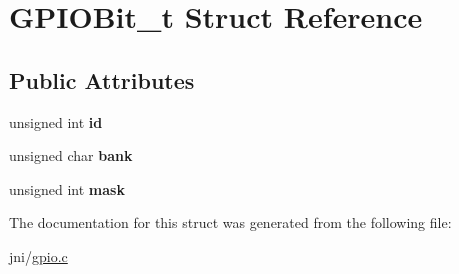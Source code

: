 \hypertarget{structGPIOBit__t}{\section{G\-P\-I\-O\-Bit\-\_\-t Struct Reference}
\label{structGPIOBit__t}
}
\subsection*{Public Attributes}
\begin{DoxyCompactItemize}
\item 
\hypertarget{structGPIOBit__t_a96b26e42b33c692a8bd8d8aac0f83c79}{unsigned int {\bfseries id}}\label{structGPIOBit__t_a96b26e42b33c692a8bd8d8aac0f83c79}

\item 
\hypertarget{structGPIOBit__t_a2cb0d9a2a9d3224d0efbcba52d8edd5b}{unsigned char {\bfseries bank}}\label{structGPIOBit__t_a2cb0d9a2a9d3224d0efbcba52d8edd5b}

\item 
\hypertarget{structGPIOBit__t_a3380a46550d3b44cc571e85f2b648816}{unsigned int {\bfseries mask}}\label{structGPIOBit__t_a3380a46550d3b44cc571e85f2b648816}

\end{DoxyCompactItemize}


The documentation for this struct was generated from the following file\-:\begin{DoxyCompactItemize}
\item 
jni/\hyperlink{gpio_8c}{gpio.\-c}\end{DoxyCompactItemize}
